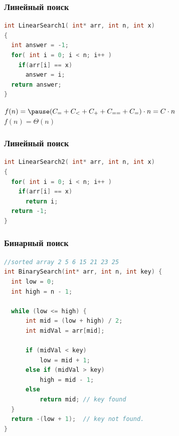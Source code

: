 \documentclass[russian, 12pt]{beamer}
\begin{document}
\lstset{style=mystyle}
\begin{frame}[fragile]
\frametitle{Линейный поиск}
\begin{lstlisting}[language=C++]
int LinearSearch1( int* arr, int n, int x)
{
  int answer = -1;
  for( int i = 0; i < n; i++ )
    if(arr[i] == x)
      answer = i;
  return answer;
}
\end{lstlisting}
$f(n) = \pause(C_{=} + C_{<} + C_{+} + C_{==} + C_{=} ) \cdot n 
= C \cdot n$\\[0.2cm] \pause
$f(n) = \Theta (n)$
\end{frame}
\lstset{style=mystyle}
\begin{frame}[fragile]
\frametitle{Линейный поиск}
\begin{lstlisting}[language=C++]
int LinearSearch2( int* arr, int n, int x)
{
  for( int i = 0; i < n; i++ )
    if(arr[i] == x)
      return i;
  return -1;
}
\end{lstlisting}
\end{frame}
\lstset{style=mystyle}
\begin{frame}[fragile]
\frametitle{Бинарный поиск}
\begin{lstlisting}[language=C++]
//sorted array 2 5 6 15 21 23 25
int BinarySearch(int* arr, int n, int key) {
  int low = 0;
  int high = n - 1;

  while (low <= high) {
      int mid = (low + high) / 2;
      int midVal = arr[mid];

      if (midVal < key)
          low = mid + 1;
      else if (midVal > key)
          high = mid - 1;
      else
          return mid; // key found
  }
  return -(low + 1);  // key not found.
}
\end{lstlisting}
\end{frame}
\end{document}
